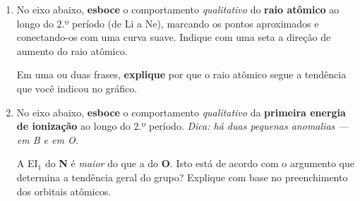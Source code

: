 \documentclass[10pt,a4paper]{article}
\begin{document}
\begin{enumerate}[label=\textbf{\alph*)}]

  \item No eixo abaixo, \textbf{esboce} o comportamento \emph{qualitativo}
        do \textbf{raio atômico} ao longo do 2.º período
        (de Li a Ne), marcando os pontos aproximados e
        conectando-os com uma curva suave.
        Indique com uma seta a direção de aumento do raio atômico.

        \begin{center}
        \end{center}

        \vspace{0.2cm}
        Em uma ou duas frases, \textbf{explique} por que o raio atômico
        segue a tendência que você indicou no gráfico.

        \vspace{2cm}

  \item No eixo abaixo, \textbf{esboce} o comportamento \emph{qualitativo}
        da \textbf{primeira energia de ionização} ao longo do 2.º período.
        \textit{Dica: há duas pequenas anomalias — em B e em O.}

        \begin{center}
        \end{center}

        \vspace{0.2cm}
        A EI$_1$ do \textbf{N} é \emph{maior} do que a do \textbf{O}.
        Isto está de acordo com o argumento que determina a tendência geral do grupo?
        Explique com base no preenchimento dos orbitais atômicos.

        \vspace{2.5cm}

\end{enumerate}
\end{document}
